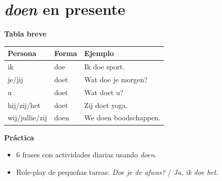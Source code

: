 \section{\textit{doen} en presente}
\textbf{Tabla breve}
\begin{center}
\begin{tabular}{lll}
\toprule
Persona & Forma & Ejemplo \\
\midrule
ik & doe & Ik doe sport. \\
je/jij & doet & Wat doe je morgen? \\
u & doet & Wat doet u? \\
hij/zij/het & doet & Zij doet yoga. \\
wij/jullie/zij & doen & We doen boodschappen. \\
\bottomrule
\end{tabular}
\end{center}

\textbf{Práctica}
\begin{itemize}[leftmargin=*]
  \item 6 frases con actividades diarias usando \textit{doen}.
  \item Role-play de pequeñas tareas: \textit{Doe je de afwas?} / \textit{Ja, ik doe het}.
\end{itemize}
